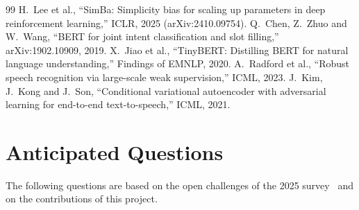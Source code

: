 \documentclass[12pt,a4paper,oneside]{report}
\begin{document}
\begin{thebibliography}{99}
 H.~Lee et al., ``SimBa: Simplicity bias for scaling up parameters in deep reinforcement learning,'' ICLR, 2025 (arXiv:2410.09754).
 Q.~Chen, Z.~Zhuo and W.~Wang, ``BERT for joint intent classification and slot filling,'' arXiv:1902.10909, 2019.
 X.~Jiao et al., ``TinyBERT: Distilling BERT for natural language understanding,'' Findings of EMNLP, 2020.
 A.~Radford et al., ``Robust speech recognition via large-scale weak supervision,'' ICML, 2023.
 J.~Kim, J.~Kong and J.~Son, ``Conditional variational autoencoder with adversarial learning for end-to-end text-to-speech,'' ICML, 2021.
\end{thebibliography}

\appendix
{}
\chapter{Anticipated Questions}
\label{app:qa}
The following questions are based on the open challenges of the 2025 survey~\cite{zhu2025survey} and on the
contributions of this project.
\end{document}
